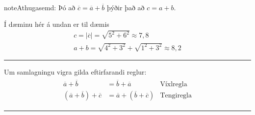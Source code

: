 \documentclass[a4paper,10pt,icelandic]{sphinxmanual}
\begin{document}
\begin{sphinxadmonition}{note}{Athugasemd:}
Þó að \(\overline{c} = \overline{a} + \overline{b}\) þýðir það  að \(c = a + b\).

Í dæminu hér á undan er til dæmis
\begin{equation*}
\begin{split}c = |\overline{c}| = \sqrt{5^2+6^2} \approx 7,8 \\
a + b = \sqrt{4^2+3^2} + \sqrt{1^2+3^2} \approx 8,2\end{split}
\end{equation*}\end{sphinxadmonition}


\bigskip\hrule\bigskip


Um samlagningu vigra gilda eftirfarandi reglur:
\begin{equation*}
\begin{split}\begin{aligned}
  \overline{a} +\overline{b} &= \overline{b} + \overline{a} & \text{Víxlregla}\\
  (\overline{a}+\overline{b})+\overline{c} &= \overline{a} + (\overline{b}+\overline{c}) & \text{Tengiregla}
\end{aligned}\end{split}
\end{equation*}

\bigskip\hrule\bigskip
\end{document}
